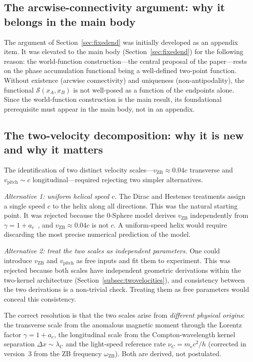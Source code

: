 \documentclass[%
 reprint, amsmath,amssymb, aps, prb, ]{revtex4-2}
\numberwithin{equation}{section}
\newcommand{\omZB}{\omega_{\text{ZB}}}
\newcommand{\lambdaC}{\lambda_{\mathrm{C}}}
\begin{document}
\subsection{The arcwise-connectivity argument: why it belongs in the main body}
\label{app:arcwise_rationale}
The argument of Section~\ref{sec:fixedend} was initially developed as an appendix item. It was elevated to the main body (Section~\ref{sec:fixedend}) for the following reason: the world-function construction---the central proposal of the paper---rests on the phase accumulation functional being a well-defined two-point function. Without existence (arcwise connectivity) and uniqueness (non-antipodality), the functional $\mathcal{S}(x_A,x_B)$ is not well-posed as a function of the endpoints alone. Since the world-function construction is the main result, its foundational prerequisite must appear in the main body, not in an appendix.

\subsection{The two-velocity decomposition: why it is new and why it matters}
\label{app:twovelocities}
The identification of two distinct velocity scales---$v_\mathrm{ZB}\approx 0.04c$ transverse and $v_\mathrm{pitch}\sim c$ longitudinal---required rejecting two simpler alternatives.

\textit{Alternative 1: uniform helical speed $c$.} The Dirac and Hestenes treatments assign a single speed $c$ to the helix along all directions. This was the natural starting point. It was rejected because the 0-Sphere model derives $v_\mathrm{ZB}$ independently from $\gamma = 1+a_e$~\cite{hanamura10}, and $v_\mathrm{ZB}\approx 0.04c$ is not $c$. A uniform-speed helix would require discarding the most precise numerical prediction of the model.

\textit{Alternative 2: treat the two scales as independent parameters.} One could introduce $v_\mathrm{ZB}$ and $v_\mathrm{pitch}$ as free inputs and fit them to experiment. This was rejected because both scales have independent geometric derivations within the two-kernel architecture (Section~\ref{subsec:twovelocities}), and consistency between the two derivations is a non-trivial check. Treating them as free parameters would conceal this consistency.

The correct resolution is that the two scales arise from \emph{different physical origins}: the transverse scale from the anomalous magnetic moment through the Lorentz factor $\gamma = 1+a_e$, the longitudinal scale from the Compton-wavelength kernel separation $\Delta x\sim\lambdaC$ and the light-speed reference rate $\nu_C = m_ec^2/h$ (corrected in version~3 from the ZB frequency $\omZB$). Both are derived, not postulated.
\end{document}
